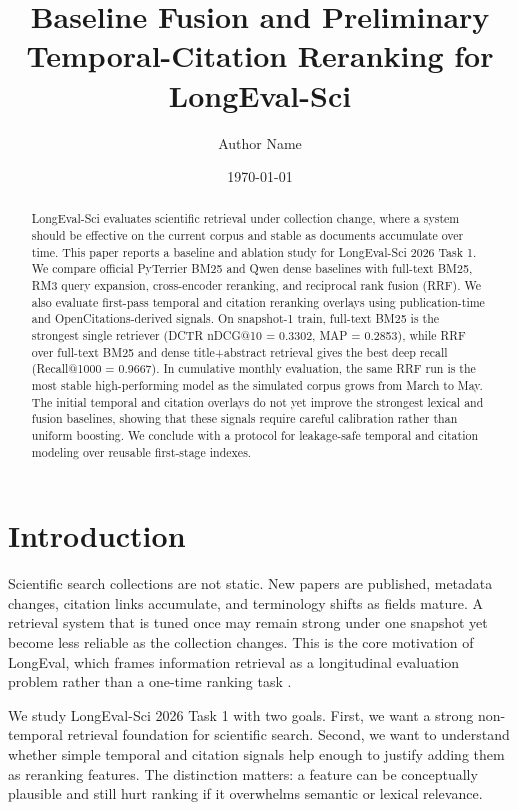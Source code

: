 \documentclass[11pt]{article}
\title{Baseline Fusion and Preliminary Temporal-Citation Reranking for LongEval-Sci}
\author{Author Name}
\date{\today}
\begin{document}
\maketitle

\begin{abstract}
LongEval-Sci evaluates scientific retrieval under collection change, where a system should be effective on the current corpus and stable as documents accumulate over time. This paper reports a baseline and ablation study for LongEval-Sci 2026 Task 1. We compare official PyTerrier BM25 and Qwen dense baselines with full-text BM25, RM3 query expansion, cross-encoder reranking, and reciprocal rank fusion (RRF). We also evaluate first-pass temporal and citation reranking overlays using publication-time and OpenCitations-derived signals. On snapshot-1 train, full-text BM25 is the strongest single retriever (DCTR nDCG@10 = 0.3302, MAP = 0.2853), while RRF over full-text BM25 and dense title+abstract retrieval gives the best deep recall (Recall@1000 = 0.9667). In cumulative monthly evaluation, the same RRF run is the most stable high-performing model as the simulated corpus grows from March to May. The initial temporal and citation overlays do not yet improve the strongest lexical and fusion baselines, showing that these signals require careful calibration rather than uniform boosting. We conclude with a protocol for leakage-safe temporal and citation modeling over reusable first-stage indexes.
\end{abstract}

\section{Introduction}

Scientific search collections are not static. New papers are published, metadata changes, citation links accumulate, and terminology shifts as fields mature. A retrieval system that is tuned once may remain strong under one snapshot yet become less reliable as the collection changes. This is the core motivation of LongEval, which frames information retrieval as a longitudinal evaluation problem rather than a one-time ranking task \cite{cancellieri_longeval_2025_clean}.

We study LongEval-Sci 2026 Task 1 with two goals. First, we want a strong non-temporal retrieval foundation for scientific search. Second, we want to understand whether simple temporal and citation signals help enough to justify adding them as reranking features. The distinction matters: a feature can be conceptually plausible and still hurt ranking if it overwhelms semantic or lexical relevance.
\end{document}
